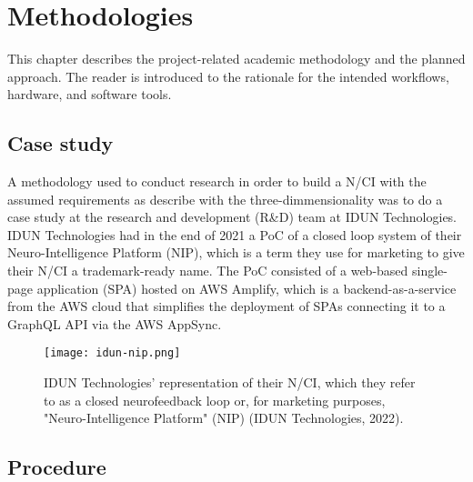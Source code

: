 \chapter{Methodologies}
\graphicspath{{Chapter3/Figs/}{Chapter3/Figs/}}

This chapter describes the project-related academic methodology and the planned approach. The reader is introduced to the rationale for the intended workflows, hardware, and software tools.

\section{Case study}
\label{chapter3-case-study}

A methodology used to conduct research in order to build a N/CI with the assumed requirements as describe with the three-dimmensionality was to do a case study at the research and development (R\&D) team at IDUN Technologies. IDUN Technologies had in the end of 2021 a PoC of a closed loop system of their Neuro-Intelligence Platform (NIP), which is a term they use for marketing to give their N/CI a trademark-ready name. The PoC consisted of a web-based single-page application (SPA) hosted on AWS Amplify, which is a backend-as-a-service from the AWS cloud that simplifies the deployment of SPAs connecting it to a GraphQL API via the AWS AppSync.

\begin{figure}[!ht]
  \centering
  \texttt{[image: idun-nip.png]}
  \caption{IDUN Technologies' representation of their N/CI, which they refer to as a closed neurofeedback loop or, for marketing purposes, "Neuro-Intelligence Platform" (NIP) (IDUN Technologies, 2022).}
  \label{fig:idun-nip}
\end{figure}


\section{Procedure}
\label{procedure}



